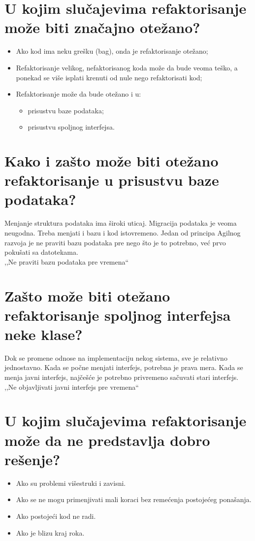 \documentclass[a4paper]{article}
\begin{document}
\section{U kojim slučajevima refaktorisanje može biti značajno otežano?}
  \begin{itemize}
    \item Ako kod ima neku grešku (bag), onda je refaktorisanje otežano; 
    \item Refaktorisanje velikog, nefaktorisanog koda može da bude veoma teško, 
          a ponekad se više isplati krenuti od nule nego refaktorisati kod; 
    \item Refaktorisanje može da bude otežano i u:
          \begin{itemize}
            \item prisustvu baze podataka;
            \item prisustvu spoljnog interfejsa.
          \end{itemize}
  \end{itemize}

\section{Kako i zašto može biti otežano refaktorisanje u prisustvu baze podataka?}
  Menjanje struktura podataka ima široki uticaj. Migracija podataka je veoma neugodna. Treba
  menjati i bazu i kod istovremeno. Jedan od principa Agilnog razvoja je ne praviti bazu podataka
  pre nego što je to potrebno, već prvo pokušati sa datotekama.\\

  ,,Ne praviti bazu podataka pre vremena``

\section{Zašto može biti otežano refaktorisanje spoljnog interfejsa neke klase?}
  Dok se promene odnose na implementaciju nekog sistema, sve je relativno jednostavno. Kada se
  počne menjati interfejs, potrebna je prava mera. Kada se menja javni interfejs, najčešće je
  potrebno privremeno sačuvati stari interfejs.\\

  ,,Ne objavljivati javni interfejs pre vremena``

\section{U kojim slučajevima refaktorisanje može da ne predstavlja dobro rešenje?}
  \begin{itemize}
    \item Ako su problemi višestruki i zavisni.
    \item Ako se ne mogu primenjivati mali koraci bez remećenja postojećeg ponašanja.
    \item Ako postojeći kod ne radi.
    \item Ako je blizu kraj roka.
  \end{itemize}
\end{document}
